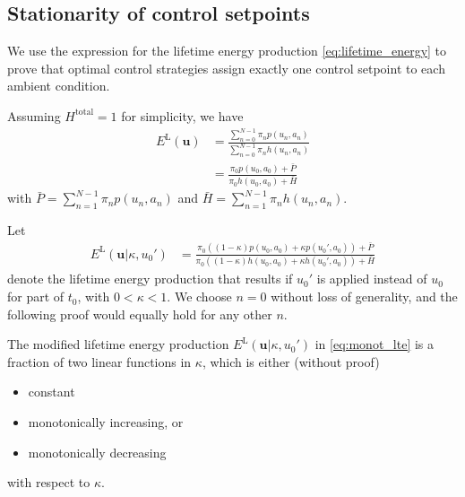 \documentclass{article}
\begin{document}
    \subsection{Stationarity of control setpoints}\label{subsec:proof_stationarity}
    We use the expression for the lifetime energy production \eqref{eq:lifetime_energy} to prove that optimal control strategies assign exactly one control setpoint to each ambient condition.

    Assuming $H^\text{total} = 1$ for simplicity, we have
    \begin{align}
        E^\text{L}(\boldsymbol{u}) &= \frac{\sum_{n = 0}^{N - 1} \pi_n p(u_n, a_n)}{\sum_{n = 0}^{N - 1} \pi_n h(u_n, a_n)}\\
        &= \frac{\pi_0 p(u_0, a_0) + \bar{P}}{\pi_0 h(u_0, a_0) + \bar{H}}\label{eq:lte_split}
    \end{align}
    with $\bar{P} = \sum_{n = 1}^{N - 1} \pi_n p(u_n, a_n)$ and $\bar{H} = \sum_{n = 1}^{N - 1} \pi_n h(u_n, a_n)$.
    
    Let
    \begin{align}
        E^\text{L}(\boldsymbol{u}|\kappa, u_0') &= \frac{\pi_0 ((1 - \kappa) p(u_0, a_0) + \kappa p(u_0', a_0)) + \bar{P}}{\pi_0 ((1 - \kappa) h(u_0, a_0) + \kappa h(u_0', a_0)) + \bar{H}}\label{eq:monot_lte}
    \end{align}
    denote the lifetime energy production that results if $u_0'$ is applied instead of $u_0$ for part of $t_0$, with $0 < \kappa < 1$. We choose $n = 0$ without loss of generality, and the following proof would equally hold for any other $n$.
    
    The modified lifetime energy production $E^\text{L}(\boldsymbol{u}|\kappa, u_0')$ in \eqref{eq:monot_lte} is a fraction of two linear functions in $\kappa$, which is either (without proof)
    \begin{itemize}
        \item constant
        \item monotonically increasing, or
        \item monotonically decreasing
    \end{itemize}
    with respect to $\kappa$.
\end{document}
